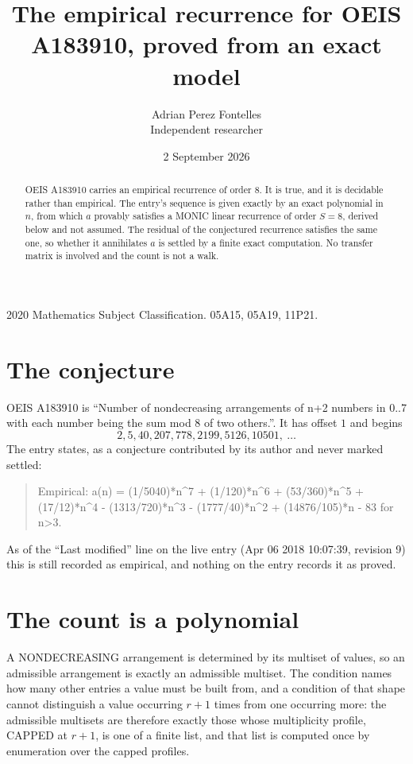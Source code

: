 \documentclass[11pt,a4paper]{article}
\title{The empirical recurrence for OEIS A183910, proved from an exact model}
\author{Adrian Perez Fontelles\\ \small Independent researcher}
\date{2 September 2026}
\theoremstyle{plain}
\theoremstyle{definition}
\begin{document}
\maketitle

\begin{abstract}
OEIS A183910 carries an empirical recurrence of order $8$. It is true, and it is
decidable rather than empirical. The entry's sequence is given exactly by an exact polynomial in $n$, from
which $a$ provably satisfies a MONIC linear recurrence of order $S=8$, derived below and not
assumed. The residual of the conjectured recurrence satisfies the same one, so whether it
annihilates $a$ is settled by a finite exact computation. No transfer matrix is involved and
the count is not a walk.
\end{abstract}

\noindent\small 2020 Mathematics Subject Classification. 05A15, 05A19, 11P21.\normalsize

\section{The conjecture}

OEIS A183910 is ``Number of nondecreasing arrangements of n+2 numbers in 0..7 with each number being the sum mod 8 of two others.''. It has offset $1$ and begins
\[
2, 5, 40, 207, 778, 2199, 5126, 10501,\ \dots
\]
The entry states, as a conjecture contributed by its author and never marked settled:
\begin{quote}
Empirical: a(n) = (1/5040)*n\^{}7 + (1/120)*n\^{}6 + (53/360)*n\^{}5 + (17/12)*n\^{}4 - (1313/720)*n\^{}3 - (1777/40)*n\^{}2 + (14876/105)*n - 83 for n>3.
\end{quote}
As of the ``Last modified'' line on the live entry (Apr 06 2018 10:07:39, revision 9)
this is still recorded as empirical, and nothing on the entry records it as proved.

\section{The count is a polynomial}

A NONDECREASING arrangement is determined by its multiset of values, so an admissible
arrangement is exactly an admissible multiset. The condition names how many other entries a
value must be built from, and a condition of that shape cannot distinguish a value occurring
$r+1$ times from one occurring more: the admissible multisets are therefore exactly those
whose multiplicity profile, CAPPED at $r+1$, is one of a finite list, and that list is computed
once by enumeration over the capped profiles.
\end{document}
